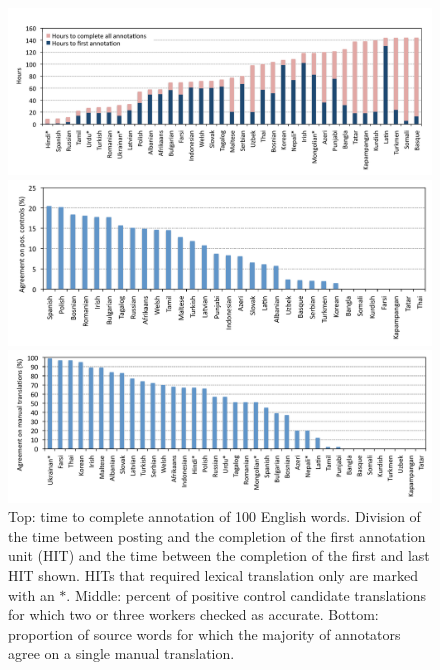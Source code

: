 \documentclass{article}
\begin{document}
\begin{figure}[h!]
\centerline{\mbox{\includegraphics[width=5in]{figures/exp4/time}}}
\centerline{\mbox{\includegraphics[width=5in]{figures/exp4/controls}}}
\centerline{\mbox{\includegraphics[width=5in]{figures/exp4/manual}}}
\caption{Top: time to complete annotation of 100 English words.  Division of the time between posting and the completion of the first annotation unit (HIT) and the time between the completion of the first and last HIT shown. HITs that required lexical translation only are marked with an $*$. Middle: percent of positive control candidate translations for which two or three workers checked as accurate. Bottom: proportion of source words for which the majority of annotators agree on a single manual translation.}
\label{fig:exp4}
\end{figure}
\end{document}
